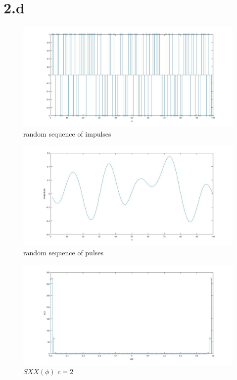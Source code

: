 \documentclass[a4paper,11pt]{article}
\begin{document}
\section*{2.d}
\begin{figure}[h]
  \hspace*{-5cm}
   \includegraphics[scale=0.45]{q_2_1}
   \caption{random sequence of impulses}\label{fig:q3}
\end{figure}
\begin{figure}[h]
  \hspace*{-5cm}
   \includegraphics[scale=0.45]{q_2_2}
   \caption{random sequence of pulses}\label{fig:q3}
\end{figure}
\begin{figure}[h]
  \hspace*{-5cm}
   \includegraphics[scale=0.45]{q_2_3}
   \caption{$SXX(\phi)$ $c=2$}\label{fig:q3}
\end{figure}
\end{document}
